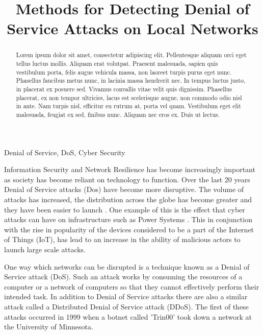 \documentclass[conference, a4paper]{IEEEtran}
\begin{document}
\title{Methods for Detecting Denial of Service Attacks on Local Networks\\
}

\author{
}

\maketitle

\begin{abstract}
    Lorem ipsum dolor sit amet, consectetur adipiscing elit. Pellentesque aliquam orci eget tellus luctus mollis. Aliquam erat volutpat. Praesent malesuada, sapien quis vestibulum porta, felis augue vehicula massa, non laoreet turpis purus eget nunc. Phasellus faucibus metus nunc, in lacinia massa hendrerit nec. In tempus luctus justo, in placerat ex posuere sed. Vivamus convallis vitae velit quis dignissim. Phasellus placerat, ex non tempor ultricies, lacus est scelerisque augue, non commodo odio nisl in ante. Nam turpis nisl, efficitur eu rutrum at, porta vel quam. Vestibulum eget elit malesuada, feugiat ex sed, finibus nunc. Aliquam nec eros ex. Duis ut lectus.
    \newline
\end{abstract}

\begin{IEEEkeywords}
    Denial of Service, DoS, Cyber Security
\end{IEEEkeywords}

    Information Security and Network Resilience has become increasingly important as society has become reliant on technology to function.
    Over the last 20 years Denial of Service attacks (Dos) have become more disruptive. The volume of attacks has increased, the distribution across the globe has become greater and they have been easier to launch \cite{20_years_of_DDOS}.
    One example of this is the effect that cyber attacks can have on infrastructure such as Power Systems \cite{DDOS_power_systems}. 
    This in conjunction with the rise in popularity of the devices considered to be a part of the Internet of Things (IoT), has lead to an increase in the ability of malicious actors to launch large scale attacks.

    One way which networks can be disrupted is a technique known as a Denial of Service attack (DoS).
    Such an attack works by consuming the resources of a computer or a network of computers so that they cannot effectively perform their intended task.
    In addition to Denial of Service attacks there are also a similar attack called a Distributed Denial of Service attack (DDoS).
    The first of these attacks occurred in 1999 when a botnet called 'Trin00' took down a network at the University of Minnesota. \cite{CERT_DDOS}
\end{document}
